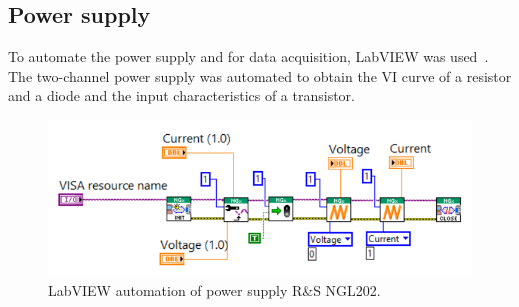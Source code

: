 \documentclass[12pt,a4paper,bold]{thesis}
\theoremstyle{thm}
\theoremstyle{definition}
\begin{document}
\subsection{Power supply} 
\indent\indent\indent To automate the power supply and for data acquisition, LabVIEW was used~\cite{ni}. The two-channel power supply was automated to obtain the VI curve of a resistor and a diode and the input characteristics of a transistor.
\begin{figure}[H]
	\centering
   \includegraphics[width=12cm]{Images/67.png} 
   \caption{LabVIEW automation of power supply R\&S NGL202.}
\end{figure}
\end{document}
